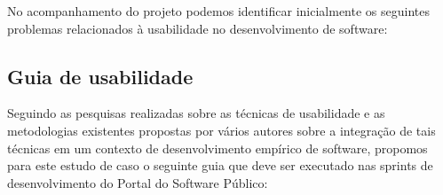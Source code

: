 No acompanhamento do projeto podemos identificar inicialmente os seguintes problemas relacionados à usabilidade no desenvolvimento de software:


	

\subsection{Guia de usabilidade}

	Seguindo as pesquisas realizadas sobre as técnicas de usabilidade e as metodologias existentes propostas por vários autores sobre a integração de tais técnicas em um contexto de desenvolvimento empírico de software, propomos  para este estudo de caso o seguinte guia que deve ser executado nas sprints de desenvolvimento do Portal do Software Público:
	
